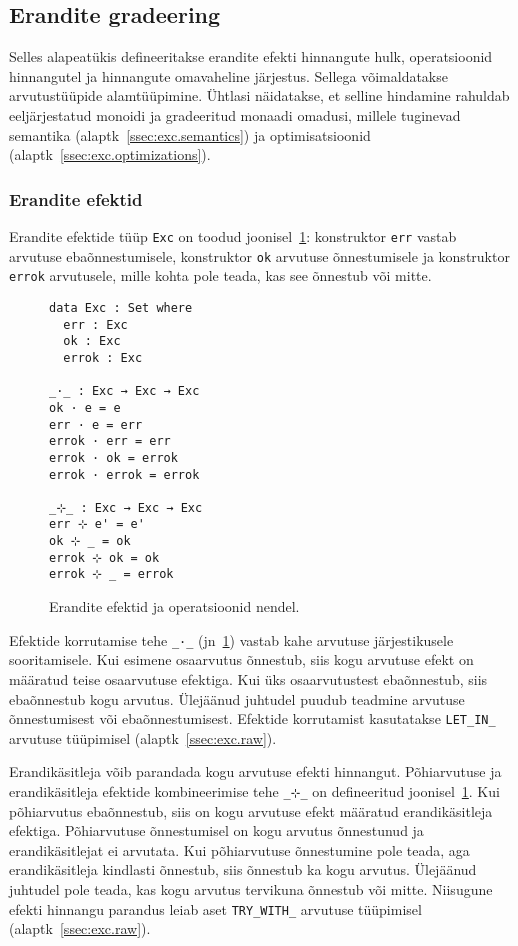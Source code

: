 \documentclass[a4paper,12pt]{article}
\begin{document}
\subsection{Erandite gradeering}\label{ssec:exc.grading}

Selles alapeatükis defineeritakse erandite efekti hinnangute hulk, operatsioonid hinnangutel ja hinnangute omavaheline järjestus.
Sellega võimaldatakse arvutustüüpide alamtüüpimine.
Ühtlasi näidatakse, et selline hindamine rahuldab eeljärjestatud monoidi ja gradeeritud monaadi omadusi,
millele tuginevad semantika (alaptk~\ref{ssec:exc.semantics}) ja optimisatsioonid (alaptk~\ref{ssec:exc.optimizations}). 

\subsubsection{Erandite efektid}\label{sssec:exc.exc}

Erandite efektide tüüp {\tt Exc} on toodud joonisel~\ref{fig:exc.exc}:
konstruktor {\tt err} vastab arvutuse ebaõnnestumisele,
konstruktor {\tt ok} arvutuse õnnestumisele ja konstruktor {\tt errok} arvutusele,
mille kohta pole teada, kas see õnnestub või mitte.

\begin{figure}
  \begin{BVerbatim}
data Exc : Set where
  err : Exc
  ok : Exc
  errok : Exc

_·_ : Exc → Exc → Exc
ok · e = e
err · e = err
errok · err = err
errok · ok = errok
errok · errok = errok

_⊹_ : Exc → Exc → Exc
err ⊹ e' = e'
ok ⊹ _ = ok
errok ⊹ ok = ok
errok ⊹ _ = errok
  \end{BVerbatim}
  \caption{Erandite efektid ja operatsioonid nendel.}
  \label{fig:exc.exc}
\end{figure}

Efektide korrutamise tehe {\tt _·_} (jn~\ref{fig:exc.exc}) vastab kahe arvutuse järjestikusele sooritamisele.
Kui esimene osaarvutus õnnestub, siis kogu arvutuse efekt on määratud teise osaarvutuse efektiga.
Kui üks osaarvutustest ebaõnnestub, siis ebaõnnestub kogu arvutus.
Ülejäänud juhtudel puudub teadmine arvutuse õnnestumisest või ebaõnnestumisest.
Efektide korrutamist kasutatakse {\tt LET_IN_} arvutuse tüüpimisel (alaptk~\ref{ssec:exc.raw}).

Erandikäsitleja võib parandada kogu arvutuse efekti hinnangut.
Põhiarvutuse ja erandikäsitleja efektide kombineerimise tehe {\tt _⊹_} on defineeritud joonisel~\ref{fig:exc.exc}.
Kui põhiarvutus ebaõnnestub, siis on kogu arvutuse efekt määratud erandikäsitleja efektiga.
Põhiarvutuse õnnestumisel on kogu arvutus õnnestunud ja erandikäsitlejat ei arvutata.
Kui põhiarvutuse õnnestumine pole teada, aga erandikäsitleja kindlasti õnnestub, siis õnnestub ka kogu arvutus.
Ülejäänud juhtudel pole teada, kas kogu arvutus tervikuna õnnestub või mitte.
Niisugune efekti hinnangu parandus leiab aset {\tt TRY_WITH_} arvutuse tüüpimisel (alaptk~\ref{ssec:exc.raw}).
\end{document}
